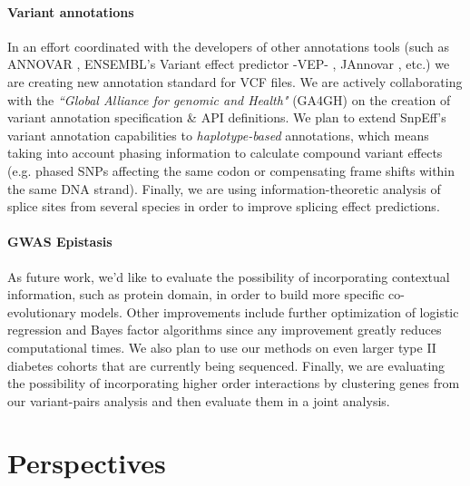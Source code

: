 \paragraph{Variant annotations} In an effort coordinated with the developers of other annotations tools (such as ANNOVAR \cite{wang2010annovar}, ENSEMBL’s Variant effect predictor -VEP- \cite{mclaren2010deriving}, JAnnovar \cite{jager2014jannovar}, etc.) we are creating new annotation standard for VCF files. 
We are actively collaborating with the \textit{``Global Alliance for genomic and Health"} (GA4GH) on the creation of variant annotation specification \& API definitions. 
We plan to extend SnpEff's variant annotation capabilities to \textit{haplotype-based} annotations, which means taking into account phasing information to calculate compound variant effects (e.g. phased SNPs affecting the same codon or compensating frame shifts within the same DNA strand). 
Finally, we are using information-theoretic analysis of splice sites from several species in order to improve splicing effect predictions.

\paragraph{GWAS Epistasis}
As future work, we'd like to evaluate the possibility of incorporating contextual information, such as protein domain, in order to build more specific co-evolutionary models. 
Other improvements include further optimization of logistic regression and Bayes factor algorithms since any improvement greatly reduces computational times. 
We also plan to use our methods on even larger type II diabetes cohorts that are currently being sequenced. 
Finally, we are evaluating the possibility of incorporating higher order interactions by clustering genes from our variant-pairs analysis and then evaluate them in a joint analysis.

\section{Perspectives}

